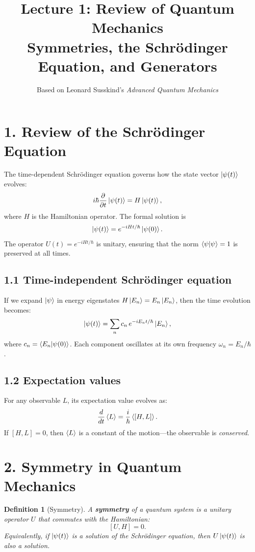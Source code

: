 \documentclass[12pt,a4paper]{article}
\title{\textbf{Lecture 1: Review of Quantum Mechanics} \\ \large Symmetries, the Schr\"odinger Equation, and Generators}
\author{Based on Leonard Susskind's \textit{Advanced Quantum Mechanics}}
\date{}
\newtheorem{definition}{Definition}
\begin{document}
\maketitle
\thispagestyle{fancy}

\section{1. Review of the Schr\"odinger Equation}

The time-dependent Schr\"odinger equation governs how the state vector $\ket{\psi(t)}$ evolves:
\[
    i\hbar \frac{\partial}{\partial t}\ket{\psi(t)} = H \ket{\psi(t)},
\]
where $H$ is the Hamiltonian operator.  The formal solution is
\[
    \ket{\psi(t)} = e^{-iHt/\hbar}\ket{\psi(0)}.
\]
The operator $U(t) = e^{-iHt/\hbar}$ is unitary, ensuring that the norm $\braket{\psi}{\psi} = 1$ is preserved at all times.

\subsection{1.1 Time-independent Schr\"odinger equation}
If we expand $\ket{\psi}$ in energy eigenstates $H\ket{E_n} = E_n\ket{E_n}$, then the time evolution becomes:
\[
    \ket{\psi(t)} = \sum_n c_n \, e^{-iE_n t/\hbar}\ket{E_n},
\]
where $c_n = \braket{E_n}{\psi(0)}$.  Each component oscillates at its own frequency $\omega_n = E_n/\hbar$.

\subsection{1.2 Expectation values}
For any observable $L$, its expectation value evolves as:
\[
    \frac{d}{dt}\expval{L} = \frac{i}{\hbar}\expval{[H, L]}.
\]
If $[H, L] = 0$, then $\expval{L}$ is a constant of the motion---the observable is \emph{conserved}.

\section{2. Symmetry in Quantum Mechanics}

\begin{definition}[Symmetry]
A \textbf{symmetry} of a quantum system is a unitary operator $U$ that commutes with the Hamiltonian:
\[
    [U, H] = 0.
\]
Equivalently, if $\ket{\psi(t)}$ is a solution of the Schr\"odinger equation, then $U\ket{\psi(t)}$ is also a solution.
\end{definition}
\end{document}
